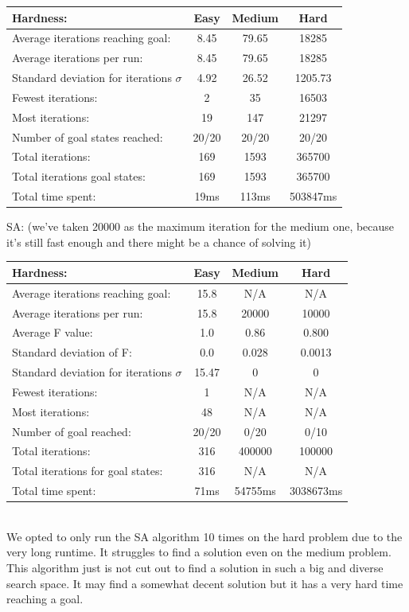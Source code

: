 \documentclass[12pt, a4paper]{article}
\begin{document}
\begin{center}
  \begin{tabular}{| l | c c c|}
    \hline
    Hardness: &\textbf{Easy} & \textbf{Medium} & \textbf{Hard} \\ \hline
    Average iterations reaching goal: & 8.45& 79.65 & 18285\\
    Average iterations per run:  & 8.45 & 79.65 & 18285\\
    Standard deviation for iterations $\sigma$ & 4.92 & 26.52 & 1205.73\\
    Fewest iterations: & 2 & 35& 16503\\ 
    Most iterations: & 19 & 147& 21297\\ 
    Number of goal states reached: & 20/20 & 20/20 & 20/20\\
    Total iterations: & 169 & 1593& 365700\\
    Total iterations goal states: & 169 & 1593& 365700\\
    Total time spent: & 19ms & 113ms & 503847ms\\
    \hline
  \end{tabular}
\end{center}
\noindent
SA: (we've taken 20000 as the maximum iteration for the medium one, because it's still fast enough and there might be a chance of solving it)\\
\begin{center}
  \begin{tabular}{| l | c c c|}
    \hline
    Hardness: &\textbf{Easy} & \textbf{Medium} & \textbf{Hard} \\ \hline
    Average iterations reaching goal: & 15.8& N/A & N/A\\
    Average iterations per run:  & 15.8 & 20000 & 10000\\
    Average F value: & 1.0 & 0.86 & 0.800\\
    Standard deviation of F: & 0.0 & 0.028 & 0.0013\\
    Standard deviation for iterations $\sigma$ & 15.47 & 0 & 0\\
    Fewest iterations: & 1 & N/A & N/A\\ 
    Most iterations: & 48 & N/A& N/A\\ 
    Number of goal reached: & 20/20 & 0/20 & 0/10\\
    Total iterations: & 316 & 400000& 100000\\
    Total iterations for goal states: & 316 & N/A& N/A\\
    Total time spent: & 71ms & 54755ms & 3038673ms\\
    \hline
  \end{tabular}
\end{center}
\noindent
\\
We opted to only run the SA algorithm 10 times on the hard problem due to the very long runtime. It struggles to find a solution even on the medium problem. This algorithm just is not cut out to find a solution in such a big and diverse search space. It may find a somewhat decent solution but it has a very hard time reaching a goal. 
\end{document}
